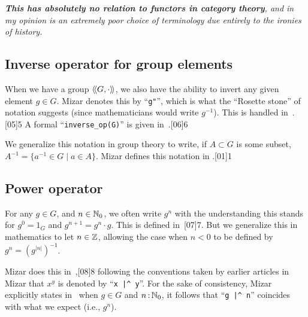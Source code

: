 {\begin{aside}
\emph{\textbf{This has absolutely no relation to functors in category theory},
and in my opinion is an extremely poor
choice of terminology due entirely to the ironies of history.}
%
\end{aside}

\subsection{Inverse operator for group elements}
When we have a group $\struct{G,\cdot}$, we also have the ability
to invert any given element $g\in G$. Mizar denotes this by
``\verb#g"#'', which is what the ``Rosette stone'' of notation suggests
(since mathematicians would write $g^{-1}$). This is handled in~.[05]{5}
A formal ``\verb#inverse_op(G)#'' is given in~.[06]{6}

\begin{notation}
We generalize this notation in group theory to write, if $A\subset G$ is
some subset, $A^{-1}=\{a^{-1}\in G\mid a\in A\}$. Mizar defines this
notation in .[01]{1}
\end{notation}

\subsection{Power operator}
For any $g\in G$, and $n\in\mathbb{N}_{0}$, we often write $g^{n}$ with the
understanding this stands for $g^{0}=1_{G}$ and $g^{n+1}=g^{n}\cdot g$.
This is defined in~[07]{7}. But we generalize this in
mathematics to let $n\in\mathbb{Z}$, allowing the case when $n<0$ to be defined
by $g^{n} = (g^{|n|})^{-1}$.

Mizar does this in~,[08]{8}
following the conventions taken by earlier articles in Mizar that
$x^{y}$ is denoted by ``\verb#x |^ y#''.
For the sake of consistency, Mizar explicitly states in~
when $g\in G$ and $n\mathop{:}\nolimits \mathbb{N}_{0}$, it follows
that ``\verb#g |^ n#'' coincides with what we expect (i.e., $g^{n}$).

}
